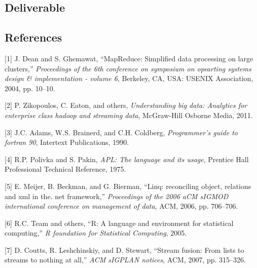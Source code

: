 \subsection{Deliverable}\label{deliverable}

\subsection{References}\label{references}

{[}1{]} J. Dean and S. Ghemawat, ``MapReduce: Simplified data processing
on large clusters,'' \emph{Proceedings of the 6th conference on
symposium on opearting systems design \& implementation - volume 6},
Berkeley, CA, USA: USENIX Association, 2004, pp. 10--10.

{[}2{]} P. Zikopoulos, C. Eaton, and others, \emph{Understanding big
data: Analytics for enterprise class hadoop and streaming data},
McGraw-Hill Osborne Media, 2011.

{[}3{]} J.C. Adams, W.S. Brainerd, and C.H. Coldberg, \emph{Programmer's
guide to fortran 90}, Intertext Publications, 1990.

{[}4{]} R.P. Polivka and S. Pakin, \emph{APL: The language and its
usage}, Prentice Hall Professional Technical Reference, 1975.

{[}5{]} E. Meijer, B. Beckman, and G. Bierman, ``Linq: reconciling
object, relations and xml in the. net framework,'' \emph{Proceedings of
the 2006 aCM sIGMOD international conference on management of data},
ACM, 2006, pp. 706--706.

{[}6{]} R.C. Team and others, ``R: A language and environment for
statistical computing,'' \emph{R foundation for Statistical Computing},
2005.

{[}7{]} D. Coutts, R. Leshchinskiy, and D. Stewart, ``Stream fusion:
From lists to streams to nothing at all,'' \emph{ACM sIGPLAN notices},
ACM, 2007, pp. 315--326.
